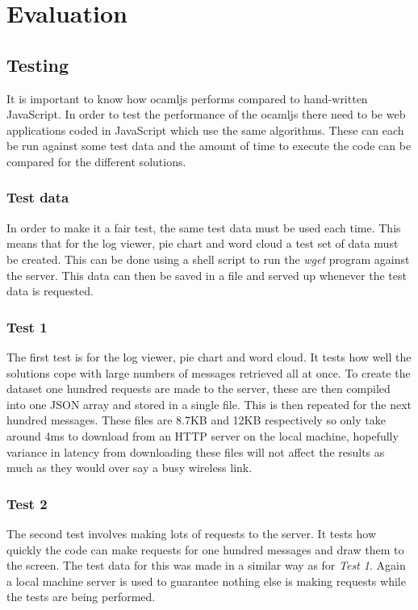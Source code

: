 \chapter{Evaluation}

\section{Testing}
It is important to know how ocamljs performs compared to hand-written JavaScript. In order to test the performance of the ocamljs there need to be web applications coded in JavaScript which use the same algorithms. These can each be run against some test data and the amount of time to execute the code can be compared for the different solutions.

\subsection{Test data}
In order to make it a fair test, the same test data must be used each time. This means that for the log viewer, pie chart and word cloud a test set of data must be created. This can be done using a shell script to run the \emph{wget} program against the server. This data can then be saved in a file and served up whenever the test data is requested.

\subsection{Test 1}
The first test is for the log viewer, pie chart and word cloud. It tests how well the solutions cope with large numbers of messages retrieved all at once. To create the dataset one hundred requests are made to the server, these are then compiled into one JSON array and stored in a single file. This is then repeated for the next hundred messages. These files are 8.7KB and 12KB respectively so only take around 4ms to download from an HTTP server on the local machine, hopefully variance in latency from downloading these files will not affect the results as much as they would over say a busy wireless link.

\subsection{Test 2}
The second test involves making lots of requests to the server. It tests how quickly the code can make requests for one hundred messages and draw them to the screen. The test data for this was made in a similar way as for \emph{Test 1}. Again a local machine server is used to guarantee nothing else is making requests while the tests are being performed.

